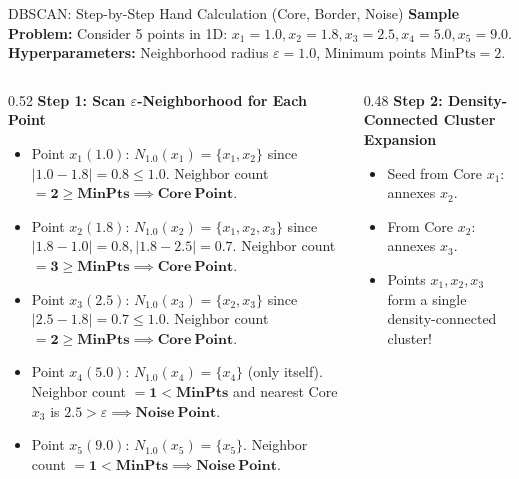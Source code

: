 \documentclass[aspectratio=169,10pt]{beamer}
\begin{document}
\begin{frame}{DBSCAN: Step-by-Step Hand Calculation (Core, Border, Noise)}
  \scriptsize
  \textbf{Sample Problem:} Consider 5 points in 1D: $x_1=1.0, x_2=1.8, x_3=2.5, x_4=5.0, x_5=9.0$.\\
  \textbf{Hyperparameters:} Neighborhood radius $\varepsilon = 1.0$, Minimum points $\text{MinPts} = 2$.
  
  \vspace{0.4em}
  \begin{columns}[T]
    \begin{column}{0.52\textwidth}
      \textbf{Step 1: Scan $\varepsilon$-Neighborhood for Each Point}
      \begin{itemize}\setlength{\itemsep}{1.5pt}
        \item Point $x_1(1.0)$: $N_{1.0}(x_1) = \{x_1, x_2\}$ since $|1.0-1.8| = 0.8 \le 1.0$.
          Neighbor count $= \mathbf{2 \ge \text{MinPts}} \implies \mathbf{Core\ Point}$.
        \item Point $x_2(1.8)$: $N_{1.0}(x_2) = \{x_1, x_2, x_3\}$ since $|1.8-1.0|=0.8, |1.8-2.5|=0.7$.
          Neighbor count $= \mathbf{3 \ge \text{MinPts}} \implies \mathbf{Core\ Point}$.
        \item Point $x_3(2.5)$: $N_{1.0}(x_3) = \{x_2, x_3\}$ since $|2.5-1.8| = 0.7 \le 1.0$.
          Neighbor count $= \mathbf{2 \ge \text{MinPts}} \implies \mathbf{Core\ Point}$.
        \item Point $x_4(5.0)$: $N_{1.0}(x_4) = \{x_4\}$ (only itself).
          Neighbor count $= \mathbf{1 < \text{MinPts}}$ and nearest Core $x_3$ is $2.5 > \varepsilon \implies \mathbf{Noise\ Point}$.
        \item Point $x_5(9.0)$: $N_{1.0}(x_5) = \{x_5\}$.
          Neighbor count $= \mathbf{1 < \text{MinPts}} \implies \mathbf{Noise\ Point}$.
      \end{itemize}
    \end{column}
    \begin{column}{0.48\textwidth}
      \textbf{Step 2: Density-Connected Cluster Expansion}
      \begin{itemize}\setlength{\itemsep}{2pt}
        \item Seed from Core $x_1$: annexes $x_2$.
        \item From Core $x_2$: annexes $x_3$.
        \item Points $x_1, x_2, x_3$ form a single density-connected cluster!
      \end{itemize}

\end{column}
\end{columns}
\end{frame}
\end{document}
